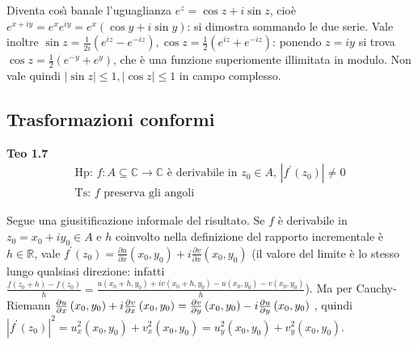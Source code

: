 \documentclass{article}
\begin{document}
Diventa cos\`{\i} banale l'uguaglianza $e^{z}=\cos z+i\sin z$, cio\`{e} $%
e^{x+iy}=e^{x}e^{iy}=e^{x}\left( \cos y+i\sin y\right) $: si dimostra
sommando le due serie. Vale inoltre $\sin z=\frac{1}{2i}\left(
e^{iz}-e^{-iz}\right) ,\cos z=\frac{1}{2}\left( e^{iz}+e^{-iz}\right) $:
ponendo $z=iy$ si trova $\cos z=\frac{1}{2}\left( e^{-y}+e^{y}\right) $, che 
\`{e} una funzione superiomente illimitata in modulo. Non vale quindi $%
\left\vert \sin z\right\vert \leq 1,\left\vert \cos z\right\vert \leq 1$ in
campo complesso.

\subsection{Trasformazioni conformi}

\textbf{Teo 1.7 }%
\begin{gather*}
\text{Hp: }f:A\subseteq 
\mathbb{C}
\rightarrow 
\mathbb{C}
\text{ \`{e} derivabile in }z_{0}\in A\text{, }\left\vert f^{\prime }\left(
z_{0}\right) \right\vert \neq 0 \\
\text{Ts: }f\text{ preserva gli angoli}
\end{gather*}

Segue una giusitificazione informale del risultato. Se $f$ \`{e} derivabile
in $z_{0}=x_{0}+iy_{0}\in A$ e $h$ coinvolto nella definizione del rapporto
incrementale \`{e} $h\in 
\mathbb{R}
$, vale $f^{\prime }\left( z_{0}\right) =\frac{\partial u}{\partial x}\left(
x_{0},y_{0}\right) +i\frac{\partial v}{\partial x}\left( x_{0},y_{0}\right) $
(il valore del limite \`{e} lo stesso lungo qualsiasi direzione: infatti $%
\frac{f\left( z_{0}+h\right) -f\left( z_{0}\right) }{h}=\frac{u\left(
x_{0}+h,y_{0}\right) +iv\left( x_{0}+h,y_{0}\right) -u\left(
x_{0},y_{0}\right) -v\left( x_{0},y_{0}\right) }{h}$). Ma per Cauchy-Riemann 
$\frac{\partial u}{\partial x}\left( x_{0},y_{0}\right) +i\frac{\partial v}{%
\partial x}\left( x_{0},y_{0}\right) =\frac{\partial v}{\partial y}\left(
x_{0},y_{0}\right) -i\frac{\partial u}{\partial y}\left( x_{0},y_{0}\right) $%
, quindi $\left\vert f^{\prime }\left( z_{0}\right) \right\vert
^{2}=u_{x}^{2}\left( x_{0},y_{0}\right) +v_{x}^{2}\left( x_{0},y_{0}\right)
=u_{y}^{2}\left( x_{0},y_{0}\right) +v_{y}^{2}\left( x_{0},y_{0}\right) $.
\end{document}
